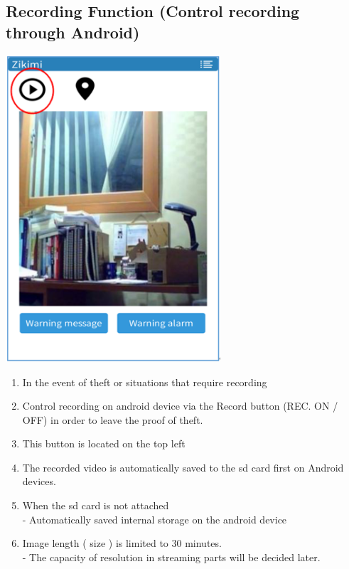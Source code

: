 \documentclass[12pt]{article}
\begin{document}
\subsection{Recording Function (Control recording through Android)}
\begin{center} 
\includegraphics[width=80mm,scale=1.2]{record}
\end{center}
\begin{enumerate}
\item In the event of theft or situations that require recording\\
\item Control recording on android device via the Record button (REC. ON / OFF) in order to leave the proof of theft.\\
\item This button is located on the top left\\
\item The recorded video is automatically saved to the sd card first on Android devices.\\
\item When the sd card is not attached\\
 - Automatically saved internal storage on the android device\\
\item Image length ( size ) is limited to 30 minutes.\\
 - The capacity of resolution in streaming parts will be decided later.\\
\end{enumerate}
\end{document}
